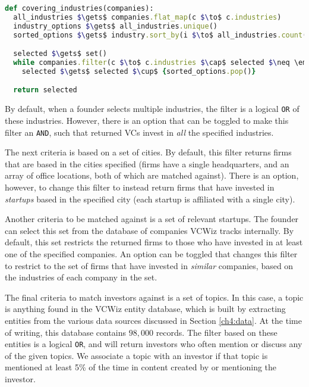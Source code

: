 \begin{minipage}{\linewidth}
\begin{lstlisting}[frame=single,mathescape=true,language=Ruby,basicstyle=\footnotesize,columns=fullflexible,caption={Display Industries},label={code:industries}]
def covering_industries(companies):
  all_industries $\gets$ companies.flat_map(c $\to$ c.industries)
  industry_options $\gets$ all_industries.unique()
  sorted_options $\gets$ industry.sort_by(i $\to$ all_industries.count(i))

  selected $\gets$ set()
  while companies.filter(c $\to$ c.industries $\cap$ selected $\neq \emptyset$).count() > 0:
    selected $\gets$ selected $\cup$ {sorted_options.pop()}

  return selected
\end{lstlisting}
\end{minipage}

By default, when a founder selects multiple industries, the filter is a logical \texttt{OR} of these industries. However, there is an option that can be toggled to make this filter an \texttt{AND}, such that returned VCs invest in \textit{all} the specified industries.

The next criteria is based on a set of cities. By default, this filter returns firms that are based in the cities specified (firms have a single headquarters, and an array of office locations, both of which are matched against). There is an option, however, to change this filter to instead return firms that have invested in \textit{startups} based in the specified city (each startup is affiliated with a single city).

Another criteria to be matched against is a set of relevant startups. The founder can select this set from the database of companies VCWiz tracks internally. By default, this set restricts the returned firms to those who have invested in at least one of the specified companies. An option can be toggled that changes this filter to restrict to the set of firms that have invested in \textit{similar} companies, based on the industries of each company in the set.

The final criteria to match investors against is a set of topics. In this case, a topic is anything found in the VCWiz entity database, which is built by extracting entities from the various data sources discussed in Section \ref{ch4:data}. At the time of writing, this database contains $98,000$ records. The filter based on these entities is a logical \texttt{OR}, and will return investors who often mention or discuss any of the given topics. We associate a topic with an investor if that topic is mentioned at least 5\% of the time in content created by or mentioning the investor.

